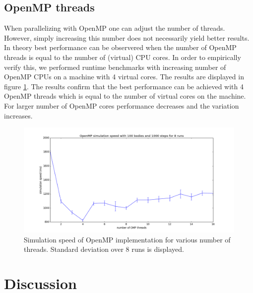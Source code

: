 \documentclass[a4paper,11pt]{scrartcl} %
\begin{document}
\subsection{OpenMP threads}
When parallelizing with OpenMP one can adjust the number of threads. However, simply increasing this number does not necessarily yield better results. In theory best performance can be observered when the number of OpenMP threads is equal to the number of (virtual) CPU cores. In order to empirically verify this, we performed runtime benchmarks with increasing number of OpenMP CPUs on a machine with 4 virtual cores. The results are displayed in figure \ref{fig:benchmark_openmp}. The results confirm that the best performance can be achieved with 4 OpenMP threads which is equal to the number of virtual cores on the machine. For larger number of OpenMP cores performance decreases and the variation increases.

\begin{figure}[h!]
  \centering
  \includegraphics[width=\textwidth]{img/benchmark_omp.png}
  \caption{Simulation speed of OpenMP implementation for various number of threads. Standard deviation over 8 runs is displayed.}
  \label{fig:benchmark_openmp}
\end{figure}

\section{Discussion}

\newpage
{}

\end{document}
